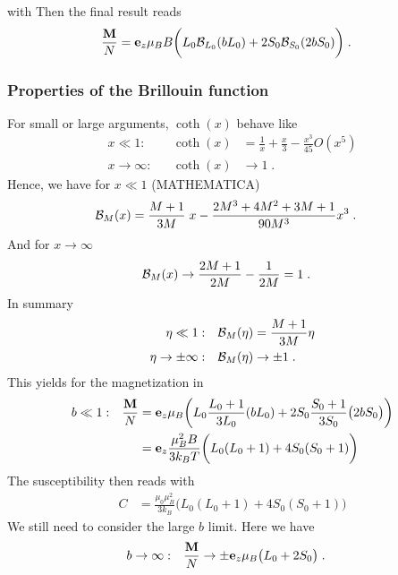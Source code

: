 %
%
with
Then the final result reads
%
\begin{align}
\frac{\mathbf M}{N}
&= \mathbf e_{z} \mu_{B} B
\bigg(  
L_{0} {\cal B}_{L_{0}}(b L_{0})
+
2S_{0} {\cal B}_{S_{0}}(2b S_{0} )
\bigg)\;.\label{eq:para:5}
\end{align}
%
\subsubsection{Properties of the Brillouin function}
For small or large arguments, $\coth(x)$ behave like
%
\begin{align*}
x\ll 1:&&\coth(x) &= \frac{1}{x} + \frac{x}{3} -\frac{x^{3}}{45} O(x^{5})\\
x\to \infty:&&\coth(x) &\to  1\;.
\end{align*}
%
Hence, we have for $x\ll 1$ (MATHEMATICA)
\begin{align}\label{eq:bernoulli:series}
{\cal B}_{M}(x) 
&=\frac{M+1}{3 M}\; x -\frac{2M^{3}+4M^{2}+3M+1}{90 M^{3}} x^{3}\;.
\end{align}
%
And for $x\to \infty$ 
%
\begin{align*}
{\cal B}_{M}(x) &\to \frac{2M+1}{2M} - \frac{1}{2M} = 1\;. 
\end{align*}
%
In summary
%
\begin{align*}
\eta\ll 1:&&{\cal B}_{M}(\eta)&= \frac{M+1}{3 M} \eta\\
\eta\to \pm\infty:&&{\cal B}_{M}(\eta)&\to  \pm 1\;.
\end{align*}
%
This yields for the magnetization in 
%
\begin{align*}
b\ll 1:&&\frac{\mathbf M}{N}
&= \mathbf e_{z} \mu_{B}
\bigg(  
L_{0} \frac{L_{0}+1}{3 L_{0}} (b L_{0})
+
2S_{0}  \frac{S_{0}+1}{3S_{0}} 
\big( 2 b S_{0} \big)
\bigg) \\
&&&= \mathbf e_{z} \frac{ \mu_{B}^{2} B}{3 k_{B}T}
\bigg(  
L_{0}(L_{0}+1)
+
4 S_{0}  (S_{0}+1)
\bigg) \;
\end{align*}
%
The susceptibility then reads
%
%
with 
%
\begin{align*}
C &= \frac{ \mu_{0}\mu_{B}^{2} }{3 k_{B}}
\bigg(  
L_{0}(L_{0}+1)
+
4 S_{0}  (S_{0}+1)
\bigg)
\end{align*}
%
We still need to consider the large $b$ limit. Here we have
%
\begin{align*}
b\to \infty:&&\frac{\mathbf M}{N}
&\to \pm  \mathbf e_{z} \mu_{B}
\big(  L_{0} +2S_{0}\big) \;.
\end{align*}
%
